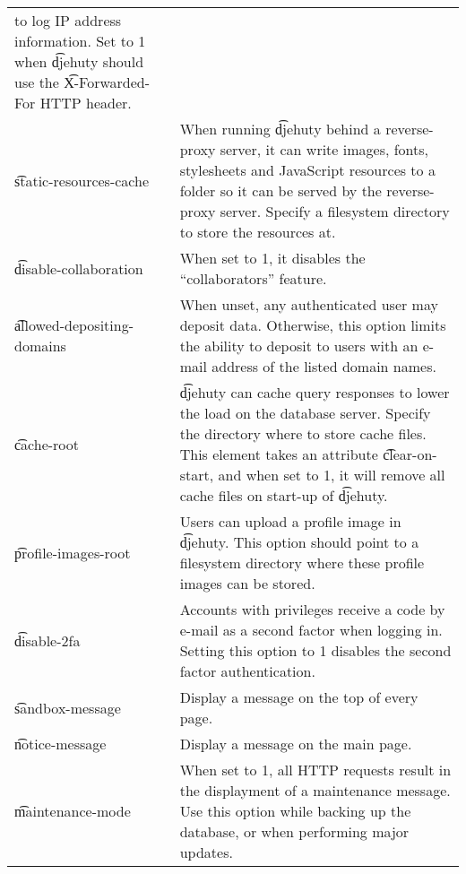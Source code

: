 \begin{tabularx}{\textwidth}{*{1}{!{\VRule[-1pt]}l}!{\VRule[-1pt]}X}
                               to log IP address information.  Set to 1 when
                               \t{djehuty} should use the \t{X-Forwarded-For}
                               HTTP header.\\
  \t{static-resources-cache} & When running \t{djehuty} behind a reverse-proxy
                               server, it can write images, fonts, stylesheets
                               and JavaScript resources to a folder so it can
                               be served by the reverse-proxy server. Specify
                               a filesystem directory to store the resources
                               at.\\
  \t{disable-collaboration}  & When set to 1, it disables the ``collaborators''
                               feature.\\
  \t{allowed-depositing-domains} & When unset, any authenticated user may
                               deposit data.  Otherwise, this option limits the
                               ability to deposit to users with an e-mail
                               address of the listed domain names.\\
  \t{cache-root}             & \t{djehuty} can cache query responses to lower
                               the load on the database server.  Specify the
                               directory where to store cache files.  This
                               element takes an attribute \t{clear-on-start},
                               and when set to 1, it will remove all cache files
                               on start-up of \t{djehuty}.\\
  \t{profile-images-root}    & Users can upload a profile image in \t{djehuty}.
                               This option should point to a filesystem directory
                               where these profile images can be stored.\\
  \t{disable-2fa}            & Accounts with privileges receive a code by e-mail
                               as a second factor when logging in.  Setting this
                               option to 1 disables the second factor
                               authentication.\\
  \t{sandbox-message}        & Display a message on the top of every page.\\
  \t{notice-message}         & Display a message on the main page.\\
  \t{maintenance-mode}       & When set to 1, all HTTP requests result in the
                               displayment of a maintenance message. Use this
                               option while backing up the database, or when
                               performing major updates.
\end{tabularx}

